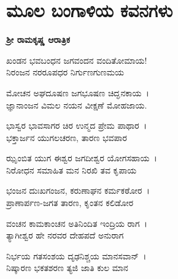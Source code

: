 \chapter[ಮೂಲ ಬಂಗಾಳಿಯ ಕವನಗಳು]{ಮೂಲ ಬಂಗಾಳಿಯ ಕವನಗಳು}

\begin{center}
\textbf{ಶ‍್ರೀ ರಾಮಕೃಷ್ಣ ಆರಾತ್ರಿಕ}
\end{center}

\begin{myquote}
ಖಂಡನ ಭವಬಂಧನ ಜಗವಂದನ ವಂದಿತೋಮಾಯ!\\ನಿರಂಜನ ನರರೂಪಧರ ನಿರ್ಗುಣಗುಣಮಯ
\end{myquote}


\begin{myquote}
ಮೋಚನ ಅಘದೂಷಣ ಜಗಭೂಷಣ ಚಿದ್ಘನಕಾಯ~।\\ಜ್ಞಾನಾಂಜನ ವಿಮಲ ನಯನ ವೀಕ್ಷಣೆ ಮೋಹಜಾಯ.
\end{myquote}


\begin{myquote}
ಭಾಸ್ವರ ಭಾವಸಾಗರ ಚಿರ ಉನ್ಮದ ಪ್ರೇಮ ಪಾಥಾರ~।\\ಭಕ್ತಾರ್ಜನ ಯುಗಲಚರಣ, ತಾರಣ ಭವಪಾರ
\end{myquote}


\begin{myquote}
ಝೃಂಬಿತ ಯುಗ ಈಶ್ವರ ಜಗದೀಶ್ವರ ಯೋಗಸಹಾಯ~।\\ನಿರೋಧನ ಸಮಾಹಿತ ಮನ ನಿರಖಿ ತವ ಕೃಪಾಯ
\end{myquote}


\begin{myquote}
ಭಂಜನ ದುಃಖಗಂಜನ, ಕರುಣಾಘನ ಕರ್ಮಕಠೋರ~।\\ಪ್ರಾಣಾರ್ಪಣ-ಜಗತ ತಾರಣ, ಕೃಂತನ ಕಲಿಡೋರ
\end{myquote}


\begin{myquote}
ವಂಚನ ಕಾಮಕಾಂಚನ ಅತಿನಿಂದಿತ ಇಂದ್ರಿಯ ರಾಗ~।\\ತ್ಯಾಗೀಶ್ವರ ಹೇ ನರವರ ದೇಹಪದೆ ಅನುರಾಗ
\end{myquote}


\begin{myquote}
ನಿರ್ಭಯ ಗತಸಂಶಯ ದೃಢನಿಶ್ಚಯ ಮಾನಸವಾನ್~।\\ನಿಷ್ಕಾರಣ ಭಕತಶರಣ ತ್ಯಜಿ ಜಾತಿ ಕುಲ ಮಾನ
\end{myquote}

